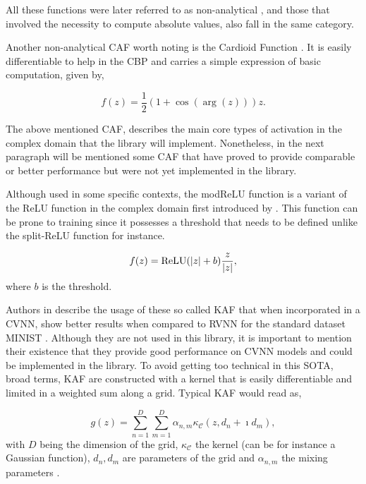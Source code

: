 All these functions were later referred to as non-analytical \parencite{scardapane2020newactfuncs}, and those that involved the necessity to compute absolute values, also fall in the same category.

Another non-analytical \gls{CAF} worth noting is the Cardioid Function \parencite{virtue2017mribettercvnn}. It is easily differentiable to help in the \gls{CBP} and carries a simple expression of basic computation, given by,

\begin{equation}
	f(z) = \dfrac{1}{2} \left( 1 + \cos(\arg(z)) \right) z. 
	\label{eq:cardioidfunc}
\end{equation}

The above mentioned \gls{CAF}, describes the main core types of activation in the complex domain that the library will implement. Nonetheless, in the next paragraph will be mentioned some \gls{CAF} that have proved to provide comparable or better performance but were not yet implemented in the library. 

Although used in some specific contexts, the modReLU function is a variant of the ReLU function in the complex domain first introduced by \textcite{arjovsky2016unitary}. This function can be prone to training since it possesses a threshold that needs to be defined unlike the split-ReLU function for instance.

\begin{equation}
	f(z) = \text{ReLU}(\left| z \right| + b) \frac{z}{\left| z \right|},
\end{equation}
where $ b $ is the threshold.

Authors in \parencite{scardapane2020newactfuncs} describe the usage of these so called \gls{KAF} that when incorporated in a \gls{CVNN}, show better  results when compared to \gls{RVNN} for the standard dataset MINIST \parencite{scardapane2020newactfuncs, lecun1998mnist}. Although they are not used in this library, it is important to mention their existence that they provide good performance on CVNN models and could be implemented in the library. To avoid getting too technical in this \gls{SOTA}, broad terms, \gls{KAF} are constructed with a kernel that is easily differentiable and limited in a weighted sum along a grid. Typical  \gls{KAF} would read as,

\begin{equation}
	g(z) = \sum_{n=1}^{D}\sum_{m=1}^{D} \alpha_{n,m} \kappa_{\mathcal{C}}\left( z, d_n + \imath d_m \right),
\end{equation}
with $D$ being the dimension of the grid, $\kappa_{\mathcal{C}}$ the kernel (can be for instance a Gaussian function), ${d_n, d_m}$ are parameters of the grid and $\alpha_{n,m}$ the mixing parameters \parencite{hofmann2008kernel, liu2011kernel}.

